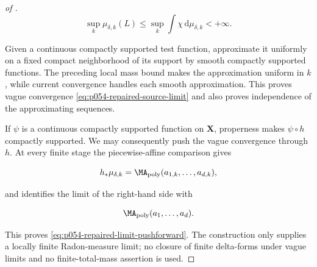 \begin{proof}[of
]
\[
 \sup_k\mu_{\delta,k}(L)
 \leq \sup_k\int\chi\,\mathrm d\mu_{\delta,k}<+\infty.
\]

Given a continuous compactly supported test function, approximate it
uniformly on a fixed compact neighborhood of its support by smooth compactly
supported functions.  The preceding local mass bound makes the approximation
uniform in \(k\), while current convergence handles each smooth
approximation.  This proves vague convergence
\eqref{eq:p054-repaired-source-limit} and also proves independence of the
approximating sequences.

If \(\psi\) is a continuous compactly supported function on \(\mathbf X\),
properness makes \(\psi\circ h\) compactly supported.  We may consequently
push the vague convergence through \(h\).  At every finite stage the
piecewise-affine comparison gives

\[
 h_*\mu_{\delta,k}
 =\MA_{\mathrm{poly}}(a_{1,k},\ldots,a_{d,k}),
\]

and \cite[Theorem~4.13]{BMPS26} identifies the limit of the right-hand side
with

\[
 \MA_{\mathrm{poly}}(a_1,\ldots,a_d).
\]

This proves
\eqref{eq:p054-repaired-limit-pushforward}.  The construction only supplies
a locally finite Radon-measure limit; no closure of finite delta-forms under
vague limits and no finite-total-mass assertion is used.
\end{proof}
